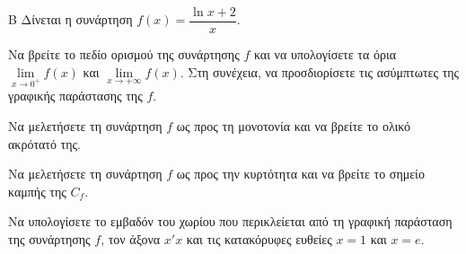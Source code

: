 \begin{thema}{Β}
Δίνεται η συνάρτηση $f(x) = \dfrac{\ln x + 2}{x}$.
\begin{erwthma}
\item Να βρείτε το πεδίο ορισμού της συνάρτησης $f$ και να υπολογίσετε τα όρια $\lim\limits_{x \to 0^+} f(x)$ και $\lim\limits_{x \to +\infty} f(x)$. Στη συνέχεια, να προσδιορίσετε τις ασύμπτωτες της γραφικής παράστασης της $f$.
\item Να μελετήσετε τη συνάρτηση $f$ ως προς τη μονοτονία και να βρείτε το ολικό ακρότατό της.
\item Να μελετήσετε τη συνάρτηση $f$ ως προς την κυρτότητα και να βρείτε το σημείο καμπής της $C_f$.
\item Να υπολογίσετε το εμβαδόν του χωρίου που περικλείεται από τη γραφική παράσταση της συνάρτησης $f$, τον άξονα $x'x$ και τις κατακόρυφες ευθείες $x = 1$ και $x = e$.
\end{erwthma}
\end{thema}
